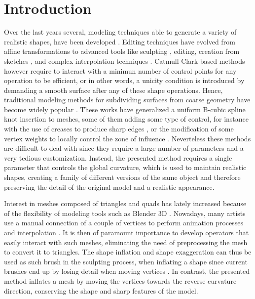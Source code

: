 \documentclass[10pt, conference]{IEEEtran}
\begin{document}
\IEEEpeerreviewmaketitle

\section{Introduction}
%
Over the last years several, modeling techniques able to generate
a variety of realistic shapes, have been developed \cite{Botsch2006}.
Editing techniques have evolved from affine transformations to advanced
tools like sculpting \cite{Coquillart1990,Galyean1991,Stanculescu2011},
editing, creation from sketches \cite{Igarashi1999,Gonen2012}, and
complex interpolation techniques \cite{Sorkine2004,Zhou2005}. Catmull-Clark
based methods however require to interact with a minimun number of
control points for any operation to be efficient, or in other words,
a unicity condition is introduced by demanding a smooth surface after
any of these shape operations. Hence, traditional modeling methods
for subdividing surfaces from coarse geometry have become widely popular
\cite{Catmull1978,Stam1998}. These works have generalized a uniform
B-cubic spline knot insertion to meshes, some of them adding some
type of control, for instance with the use of creases to produce sharp
edges \cite{DeRose1998}, or the modification of some vertex weights
to locally control the zone of influence \cite{Biermann2000}. Neverteless
these methods are difficult to deal with since they require a large
number of parameters and a very tedious customization. Instead, the
presented method requires a single parameter that controls the global
curvature, which is used to maintain realistic shapes, creating a
family of different versions of the same object and therefore preserving
the detail of the original model and a realistic appearance. 

Interest in meshes composed of triangles and quads has lately increased
because of the flexibility of modeling tools such as Blender 3D \cite{blender}.
Nowadays, many artists use a manual connection of a couple of vertices
to perform animation processes and interpolation \cite{Mullen2007}.
It is then of paramount importance to develop operators that easily
interact with such meshes, eliminating the need of preprocessing the
mesh to convert it to triangles. The shape inflation and shape exaggeration
can thus be used as such brush in the sculpting process, when inflating
a shape since current brushes end up by losing detail when moving
vertices \cite{Stanculescu2011}. In contrast, the presented method
inflates a mesh by moving the vertices towards the reverse curvature
direction, conserving the shape and sharp features of the model.
\end{document}
